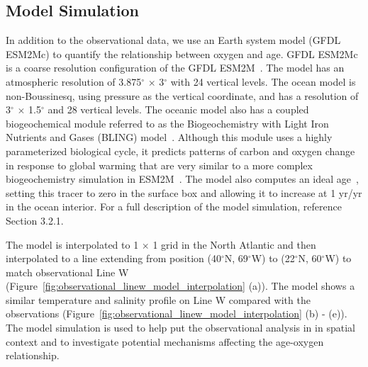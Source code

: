 \subsection{Model Simulation}
In addition to the observational data, we use an Earth system model (GFDL ESM2Mc)
to quantify the relationship between oxygen and age. GFDL ESM2Mc~\citep{Galbraith2011}
is a coarse resolution configuration of the GFDL ESM2M~\citep{Dunne2012}. The model
has an atmospheric resolution of 3.875$^{\circ}$ $\times$ 3$^{\circ}$  with 24 vertical levels. The ocean
model is non-Boussinesq, using pressure as the vertical coordinate, and has a
resolution of 3$^{\circ}$ $\times$ 1.5$^{\circ}$  and 28 vertical levels. The oceanic model also has a
coupled biogeochemical module referred to as the Biogeochemistry with Light Iron
Nutrients and Gases (BLING) model~\citep{Galbraith2010}. Although this module
uses a highly parameterized biological cycle, it predicts patterns of carbon and
oxygen change in response to global warming that are very similar to a more
complex biogeochemistry simulation in ESM2M~\citep{Small2014}. The model
also computes an ideal age~\citep{Thiele1990}, setting this tracer to
zero in the surface box and allowing it to increase at 1 yr/yr in the ocean
interior. For a full description of the model simulation, reference Section 3.2.1.

The model is interpolated to 1 $\times$ 1  grid in the North Atlantic and then
interpolated to a line extending from position (40$^{\circ}$N, 69$^{\circ}$W)
to (22$^{\circ}$N, 60$^{\circ}$W) to match observational Line W
(Figure~\ref{fig:observational_linew_model_interpolation} (a)). The model shows
a similar temperature and salinity profile on Line W compared with the
observations (Figure~\ref{fig:observational_linew_model_interpolation} (b) - (e)).
The model simulation is used to help put the observational analysis in in spatial
context and to investigate potential mechanisms affecting the age-oxygen relationship.

